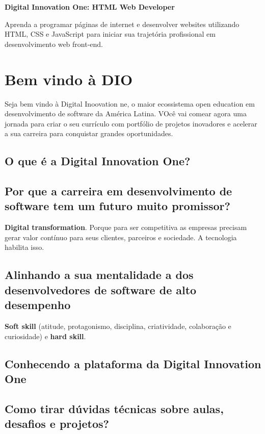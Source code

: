 \documentclass[12pt,a4paper]{article}
\begin{document}
	\textbf{ \centering \Huge Digital Innovation One: HTML Web Developer} %
	
	Aprenda a programar páginas de internet e desenvolver websites utilizando HTML, CSS e JavaScript para iniciar sua trajetória profissional em desenvolvimento web front-end.
	
	\section{Bem vindo à DIO}
	
	Seja bem vindo à Digital Inoovation ne, o maior ecossistema open education em desenvolvimento  de software da América Latina. VOcê vai comear agora uma jornada para criar o seu currículo com portfólio de projetos inovadores e acelerar a sua carreira para conquistar grandes oportunidades.
	
	\subsection{O que é a Digital Innovation One?}
	
	\subsection{Por que a carreira em desenvolvimento de software tem um futuro muito promissor?}
	
	\textbf{Digital transformation}. Porque para ser competitiva as empresas precisam gerar valor contínuo para seus clientes, parceiros e sociedade. A tecnologia habilita isso.
	
	\subsection{Alinhando a sua mentalidade a dos desenvolvedores de software de alto desempenho}
	
	\textbf{Soft skill} (atitude, protagonismo, disciplina, criatividade, colaboração e curiosidade) e \textbf{hard skill}.
	
	\subsection{Conhecendo a plataforma da Digital Innovation One}
	
	\subsection{Como tirar dúvidas técnicas sobre aulas, desafios e projetos?}
	
\end{document}

